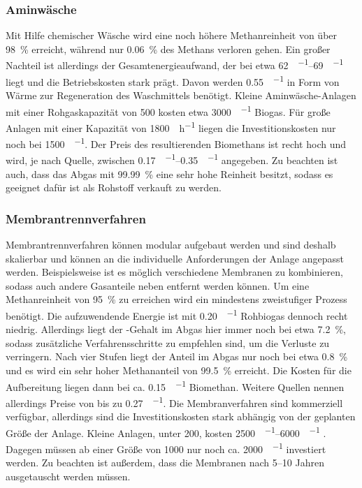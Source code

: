 \subsubsection{Aminwäsche}
Mit Hilfe chemischer Wäsche wird eine noch höhere Methanreinheit von über \SI{98}{\percent} erreicht, während nur \SI{0,06}{\percent} des Methans verloren gehen. Ein großer Nachteil ist allerdings der Gesamtenergieaufwand, der bei etwa \SIrange{62}{69}{\kwh\per\normvol} liegt und die Betriebskosten stark prägt. Davon werden \SI{0,55}{\kwh\per\normvol} in Form von Wärme zur Regeneration des Waschmittels benötigt. Kleine Aminwäsche-Anlagen mit einer Rohgaskapazität von \SI{500}{\normvolh} kosten etwa \SI{3000}{\sieuro\per\normvolh} Biogas. Für große Anlagen mit einer Kapazität von \SI{1800}{\normvol\per\hour} liegen die Investitionskosten nur noch bei \SI{1500}{\sieuro\per\normvolh}. Der Preis des resultierenden Biomethans ist recht hoch und wird, je nach Quelle, zwischen \SIrange{0,17}{0,35}{\sieuro\per\normvol} angegeben. Zu beachten ist auch, dass das Abgas mit \SI{99,99}{\percent} eine sehr hohe  Reinheit besitzt, sodass es geeignet dafür ist als Rohstoff verkauft zu werden. \parencite{Emp18} \parencite{BHPT13} \parencite{DSW15} \parencite{KGKK2019} \parencite{Coll17}


\subsubsection{Membrantrennverfahren}
Membrantrennverfahren können modular aufgebaut werden und sind deshalb skalierbar und können an die individuelle Anforderungen der Anlage angepasst werden. Beispielsweise ist es möglich verschiedene Membranen zu kombinieren, sodass auch andere Gasanteile neben  entfernt werden können. Um eine Methanreinheit von \SI{95}{\percent} zu erreichen wird ein mindestens zweistufiger Prozess benötigt. Die aufzuwendende Energie ist mit \SI{0,20}{\kwh\per\normvol} Rohbiogas dennoch recht niedrig. Allerdings liegt der -Gehalt im Abgas hier immer noch bei etwa \SI{7,2}{\percent}, sodass zusätzliche Verfahrensschritte zu empfehlen sind, um die Verluste zu verringern. Nach vier Stufen liegt der Anteil im Abgas nur noch bei etwa \SI{0,8}{\percent} und es wird ein sehr hoher Methananteil von \SI{99,5}{\percent} erreicht. Die Kosten für die Aufbereitung liegen dann bei ca. \SI{0,15}{\sieuro\per\normvol} Biomethan. Weitere Quellen nennen allerdings Preise von bis zu \SI{0,27}{\sieuro\per\normvol}. Die Membranverfahren sind kommerziell verfügbar, allerdings sind die Investitionskosten stark abhängig von der geplanten Größe der Anlage. Kleine Anlagen, unter \SI{200}{\normvolh}, kosten \SIrange{2500}{6000}{\sieuro\per\normvolh} \parencite{BHPT13}. Dagegen müssen ab einer Größe von \SI{1000}{\normvolh} nur noch ca. \SI{2000}{\sieuro\per\normvolh} investiert werden. Zu beachten ist außerdem, dass die Membranen nach \SIrange{5}{10}{\relax} Jahren ausgetauscht werden müssen. \parencite{Emp18} \parencite{BHPT13} \parencite{KGKK2019} \parencite{Miltner2016}


